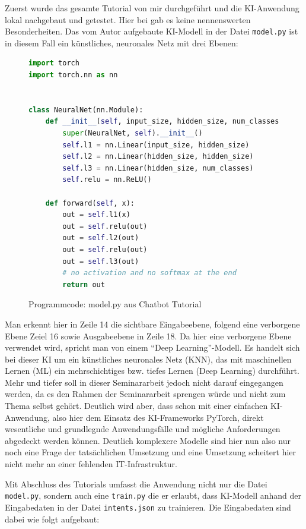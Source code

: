 \documentclass[12pt,oneside,titlepage,listof=totoc,bibliography=totoc]{scrartcl}
\newcommand{\code}[1]{\colorbox{code-gray}{\texttt{#1}}}
\begin{document}
Zuerst wurde das gesamte Tutorial von mir durchgeführt und die KI-Anwendung lokal nachgebaut und getestet. Hier bei gab es keine nennenswerten Besonderheiten. Das vom Autor aufgebaute KI-Modell in der Datei \code{model.py} ist in diesem Fall ein künstliches, neuronales Netz mit drei Ebenen:

\begin{figure}[H]
	\caption{Programmcode: model.py aus Chatbot Tutorial}
	\label{fig:code-nn-basis}
\begin{lstlisting}[language=python]
import torch
import torch.nn as nn


class NeuralNet(nn.Module):
    def __init__(self, input_size, hidden_size, num_classes):
        super(NeuralNet, self).__init__()
        self.l1 = nn.Linear(input_size, hidden_size) 
        self.l2 = nn.Linear(hidden_size, hidden_size) 
        self.l3 = nn.Linear(hidden_size, num_classes)
        self.relu = nn.ReLU()
    
    def forward(self, x):
        out = self.l1(x)
        out = self.relu(out)
        out = self.l2(out)
        out = self.relu(out)
        out = self.l3(out)
        # no activation and no softmax at the end
        return out
\end{lstlisting}
\end{figure}

Man erkennt hier in Zeile 14 die sichtbare Eingabeebene, folgend eine verborgene Ebene Zeiel 16 sowie Ausgabeebene in Zeile 18. Da hier eine verborgene Ebene verwendet wird, spricht man von einem \enquote{Deep Learning}-Modell. Es handelt sich bei dieser \acl{KI} um ein künstliches neuronales Netz (KNN), das mit maschinellen Lernen (ML) ein mehrschichtiges bzw. tiefes Lernen (Deep Learning) durchführt. Mehr und tiefer soll in dieser Seminararbeit jedoch nicht darauf eingegangen werden, da es den Rahmen der Seminararbeit sprengen würde und nicht zum Thema selbst gehört. Deutlich wird aber, dass schon mit einer einfachen KI-Anwendung, also hier dem Einsatz des KI-Frameworks PyTorch, direkt wesentliche und grundlegnde Anwendungsfälle und mögliche Anforderungen abgedeckt werden können. Deutlich komplexere Modelle sind hier nun also nur noch eine Frage der tatsächlichen Umsetzung und eine Umsetzung scheitert hier nicht mehr an einer fehlenden IT-Infrastruktur.

Mit Abschluss des Tutorials umfasst die Anwendung nicht nur die Datei \code{model.py}, sondern auch eine \code{train.py} die er erlaubt, dass KI-Modell anhand der Eingabedaten in der Datei \code{intents.json} zu trainieren. Die Eingabedaten sind dabei wie folgt aufgebaut:
\end{document}
